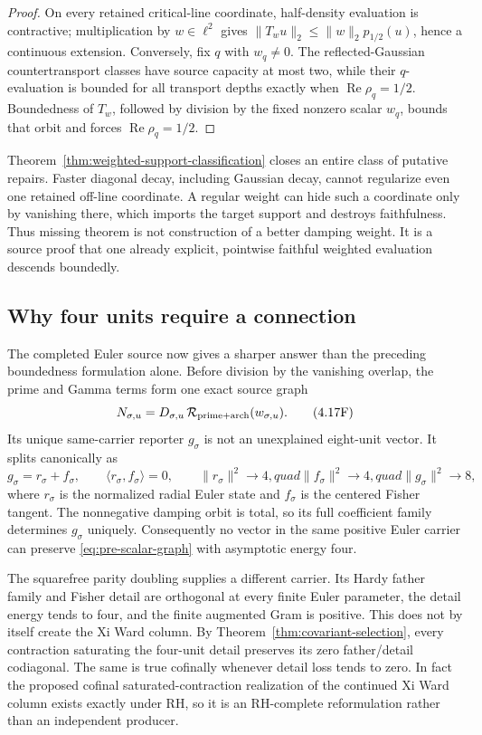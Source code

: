 \documentclass[11pt]{article}
\theoremstyle{definition}
\theoremstyle{remark}
\newcommand{\cR}{\mathcal R}
\newcommand{\Rea}{\operatorname{Re}}
\begin{document}
\begin{proof}
On every retained critical-line coordinate, half-density evaluation is
contractive; multiplication by \(w\in\ell^2\) gives
\(\|T_wu\|_2\le\|w\|_2p_{1/2}(u)\), hence a continuous extension.  Conversely,
fix \(q\) with \(w_q\ne0\).  The reflected-Gaussian countertransport classes
have source capacity at most two, while their \(q\)-evaluation is bounded
for all transport depths exactly when \(\Rea\rho_q=1/2\).  Boundedness of
\(T_w\), followed by division by the fixed nonzero scalar \(w_q\), bounds
that orbit and forces \(\Rea\rho_q=1/2\).
\end{proof}

Theorem~\ref{thm:weighted-support-classification} closes an entire class of
putative repairs.  Faster diagonal decay, including Gaussian decay, cannot
regularize even one retained off-line coordinate.  A regular weight can hide
such a coordinate only by vanishing there, which imports the target support
and destroys faithfulness.  Thus missing theorem is not construction of a
better damping weight.  It is a source proof that one already explicit,
pointwise faithful weighted evaluation descends boundedly.

\subsection{Why four units require a connection}

The completed Euler source now gives a sharper answer than the preceding
boundedness formulation alone.  Before division by the vanishing overlap,
the prime and Gamma terms form one exact source graph
\[
 N_{\sigma,u}=D_{\sigma,u}\,
       \cR_{\rm prime+arch}(w_{\sigma,u}).
\tag{4.17F}\label{eq:pre-scalar-graph}
\]
Its unique same-carrier reporter \(g_\sigma\) is not an unexplained
eight-unit vector.  It splits canonically as
\[
 g_\sigma=r_\sigma+f_\sigma,\qquad
 \langle r_\sigma,f_\sigma\rangle=0,\qquad
 \|r_\sigma\|^2\to4,quad
 \|f_\sigma\|^2\to4,quad
 \|g_\sigma\|^2\to8,
\tag{4.17G}\label{eq:orthogonal-four-plus-four}
\]
where \(r_\sigma\) is the normalized radial Euler state and
\(f_\sigma\) is the centered Fisher tangent.  The nonnegative damping orbit
is total, so its full coefficient family determines \(g_\sigma\) uniquely.
Consequently no vector in the same positive Euler carrier can preserve
\eqref{eq:pre-scalar-graph} with asymptotic energy four.

The squarefree parity doubling supplies a different carrier.  Its Hardy
father family and Fisher detail are orthogonal at every finite Euler
parameter, the detail energy tends to four, and the finite augmented Gram is
positive.  This does not by itself create the Xi Ward column.  By
Theorem~\ref{thm:covariant-selection}, every contraction saturating the
four-unit detail preserves its zero father/detail codiagonal.  The same is
true cofinally whenever detail loss tends to zero.  In fact the proposed
cofinal saturated-contraction realization of the continued Xi Ward column
exists exactly under RH, so it is an RH-complete reformulation rather than an
independent producer.
\end{document}
